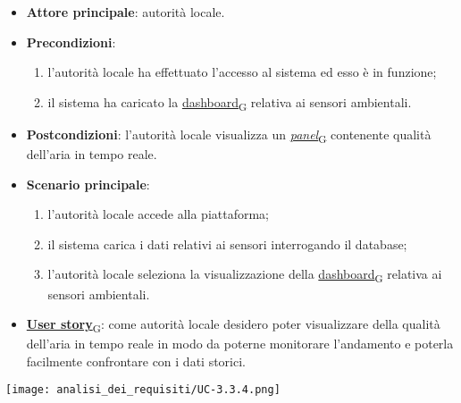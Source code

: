 \newpage
{}
\begin{itemize}
	\item \textbf{Attore principale}: autorità locale.
	\item \textbf{Precondizioni}:
	      \begin{enumerate}
		      \item l'autorità locale ha effettuato l'accesso al sistema ed esso è in funzione;
		      \item il sistema ha caricato la \href{https://7last.github.io/docs/pb/documentazione-interna/glossario\#dashboard}{dashboard\textsubscript{G}} relativa ai sensori ambientali.
	      \end{enumerate}
	\item \textbf{Postcondizioni}: l'autorità locale visualizza un \href{https://7last.github.io/docs/pb/documentazione-interna/glossario\#panel}{\textit{panel}\textsubscript{G}} contenente qualità dell'aria in tempo reale.
	\item \textbf{Scenario principale}:
	      \begin{enumerate}
		      \item l'autorità locale accede alla piattaforma;
		      \item il sistema carica i dati relativi ai sensori interrogando il database;
		      \item l'autorità locale seleziona la visualizzazione della \href{https://7last.github.io/docs/pb/documentazione-interna/glossario\#dashboard}{dashboard\textsubscript{G}} relativa ai sensori ambientali.
	      \end{enumerate}
	\item \href{https://7last.github.io/docs/pb/documentazione-interna/glossario\#user-story}{\textbf{User story}\textsubscript{G}}:
	      come autorità locale desidero poter visualizzare della qualità dell'aria in tempo reale in modo da poterne monitorare l'andamento
	      e poterla facilmente confrontare con i dati storici.
\end{itemize}
\begin{center}
	\texttt{[image: analisi\_dei\_requisiti/UC-3.3.4.png]}
\end{center}

